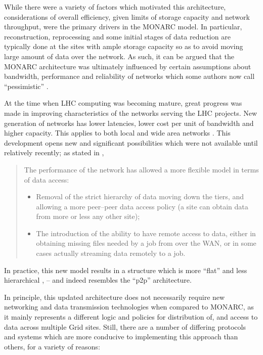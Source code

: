 While there were a variety of factors which motivated this architecture, considerations of overall efficiency, given
limits of storage capacity and network throughput, were the primary drivers in the MONARC model. In particular,
reconstruction, reprocessing and some initial stages of data reduction are typically done at the sites with
ample  storage capacity so as to avoid moving large amount of data over the network. As such, it can be argued 
that the MONARC architecture was ultimately influenced by certain assumptions about bandwidth, performance 
and reliability of networks which some authors now call ``pessimistic'' \cite [p.~105]{lhc_model_update}.

At the time when LHC computing was becoming mature, great progress was made in improving
characteristics of the networks serving the LHC projects. New generation of networks has lower
latencies, lower cost per unit of bandwidth and higher capacity. This applies to both local and wide 
area networks  \cite[p.104]{lhc_model_update}. This development opens new and significant possibilities 
which were not available until relatively recently; as stated in \cite{lhc_model_update},

\begin{quote}
The performance of the network has allowed a more flexible model in terms of data access:
	
	\begin{itemize}
		\item Removal of the strict hierarchy of data moving down the tiers, and allowing a
		more peer--peer data access policy (a site can obtain data from more or less any 
		other site);
		
		\item The introduction of the ability to have remote access to data, either in obtaining
		missing files needed by a job from over the WAN, or in some cases actually
		streaming data remotely to a job.
		
	\end{itemize}
\end{quote}

In practice, this new model results in a structure which is more ``flat'' and less hierarchical \cite{lhc_model_update}, \cite{courier_update} -- and indeed
resembles the ``p2p'' architecture.

In principle, this updated architecture does not necessarily require new networking and data transmission 
technologies when compared to MONARC, as it mainly represents a different logic and policies for 
distribution of, and access to data across multiple Grid sites. Still, there are a number of differing 
protocols and systems which are more conducive to implementing this approach than others, for a variety of reasons:

